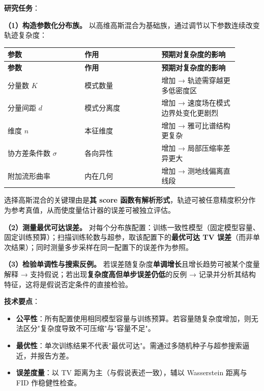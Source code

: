 \documentclass[12pt,a4paper]{ctexart}
\begin{document}
\textbf{研究任务}：

\textbf{（1）构造参数化分布族。} 以高维高斯混合为基础族，通过调节以下参数连续改变轨迹复杂度：

\begin{longtable}{|>{\raggedright\arraybackslash}p{0.300\linewidth}|>{\raggedright\arraybackslash}p{0.300\linewidth}|>{\raggedright\arraybackslash}p{0.300\linewidth}|}
\hline
\textbf{参数} & \textbf{作用} & \textbf{预期对复杂度的影响} \\
\hline
\endfirsthead
\hline
\textbf{参数} & \textbf{作用} & \textbf{预期对复杂度的影响} \\
\hline
\endhead
分量数 $K$ & 模式数量 & 增加 → 轨迹需穿越更多低密度区 \\
\hline
分量间距 $d$ & 模式分离度 & 增加 → 速度场在模式边界处变化更剧烈 \\
\hline
维度 $n$ & 本征维度 & 增加 → 雅可比谱结构更复杂 \\
\hline
协方差条件数 $\sigma$ & 各向异性 & 增加 → 局部压缩率差异更大 \\
\hline
附加流形曲率 & 内在几何 & 增加 → 测地线偏离直线段 \\
\hline
\end{longtable}

选择高斯混合的关键理由是\textbf{其 score 函数有解析形式}，轨迹可被任意精度积分作为参考真值，从而使度量估计器的误差可被独立评估。

\textbf{（2）测量最优可达误差。} 对每个分布族配置：训练一致性模型（固定模型容量、固定训练预算）；扫描训练轮数与超参，取该配置下的\textbf{最优可达 TV 误差}（而非单次结果）；同时测量多步采样在同一配置下的误差作为参照。

\textbf{（3）检验单调性与搜索反例。} 若误差随复杂度\textbf{单调增长}且增长趋势可被某个度量解释 → 支持假说；若出现\textbf{复杂度高但单步误差仍低}的反例 → 记录并分析其结构特征，这将是假说否定条件的直接检验。

\textbf{技术要点}：

\begin{itemize}[leftmargin=2em,itemsep=2pt,topsep=3pt]
  \item \textbf{公平性}：所有配置使用相同模型容量与训练预算。若容量随复杂度增加，则无法区分"复杂度导致不可压缩"与"容量不足"。
  \item \textbf{最优性}：单次训练结果不代表"最优可达"。需通过多随机种子与超参搜索逼近，并报告方差。
  \item \textbf{误差度量}：以 TV 距离为主（与假说表述一致），辅以 Wasserstein 距离与 FID 作稳健性检查。
\end{itemize}
\end{document}
